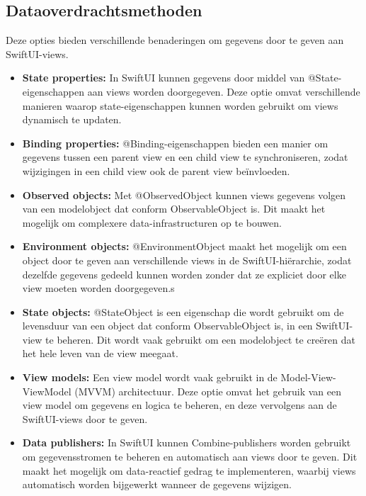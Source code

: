 \subsection{Dataoverdrachtsmethoden}
Deze opties bieden verschillende benaderingen om gegevens door te geven aan SwiftUI-views.
\begin{itemize}
    \item {\textbf{State properties:} In SwiftUI kunnen gegevens door middel van @State-eigenschappen aan views worden doorgegeven. Deze optie omvat verschillende manieren waarop state-eigenschappen kunnen worden gebruikt om views dynamisch te updaten.}
    \item {\textbf{Binding properties:} @Binding-eigenschappen bieden een manier om gegevens tussen een parent view en een child view te synchroniseren, zodat wijzigingen in een child view ook de parent view beïnvloeden.}
    \item {\textbf{Observed objects:} Met @ObservedObject kunnen views gegevens volgen van een modelobject dat conform ObservableObject is. Dit maakt het mogelijk om complexere data-infrastructuren op te bouwen.}
    \item {\textbf{Environment objects:} @EnvironmentObject maakt het mogelijk om een object door te geven aan verschillende views in de SwiftUI-hiërarchie, zodat dezelfde gegevens gedeeld kunnen worden zonder dat ze expliciet door elke view moeten worden doorgegeven.}s
    \item {\textbf{State objects:} @StateObject is een eigenschap die wordt gebruikt om de levensduur van een object dat conform ObservableObject is, in een SwiftUI-view te beheren. Dit wordt vaak gebruikt om een modelobject te creëren dat het hele leven van de view meegaat.}
    \item {\textbf{View models:} Een view model wordt vaak gebruikt in de Model-View-ViewModel (MVVM) architectuur. Deze optie omvat het gebruik van een view model om gegevens en logica te beheren, en deze vervolgens aan de SwiftUI-views door te geven.}
    \item {\textbf{Data publishers:} In SwiftUI kunnen Combine-publishers worden gebruikt om gegevensstromen te beheren en automatisch aan views door te geven. Dit maakt het mogelijk om data-reactief gedrag te implementeren, waarbij views automatisch worden bijgewerkt wanneer de gegevens wijzigen.}
\end{itemize}
